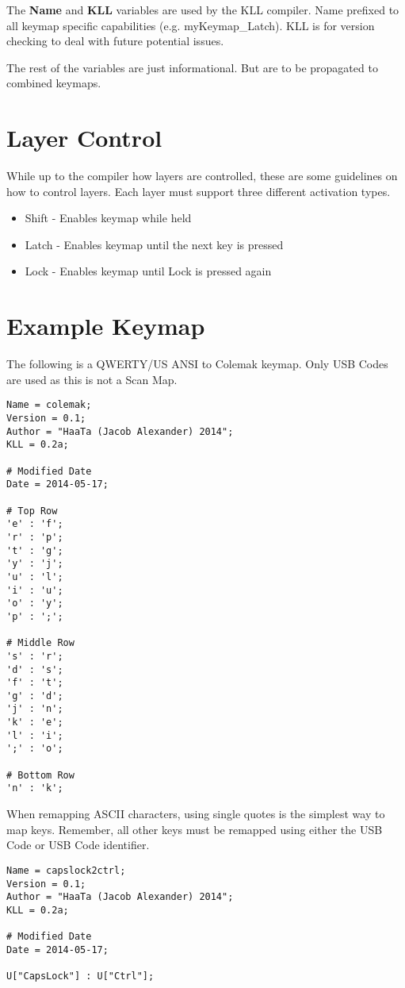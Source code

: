 \documentclass{kiibohd-template}
\begin{document}
The \textbf{Name} and \textbf{KLL} variables are used by the KLL compiler.
Name prefixed to all keymap specific capabilities (e.g. myKeymap\_Latch).
KLL is for version checking to deal with future potential issues.

The rest of the variables are just informational.
But are to be propagated to combined keymaps.


\section{Layer Control}

While up to the compiler how layers are controlled, these are some guidelines on how to control layers.
Each layer must support three different activation types.

\begin{itemize}
	\item Shift - Enables keymap while held
    \item Latch - Enables keymap until the next key is pressed
    \item Lock - Enables keymap until Lock is pressed again
\end{itemize}


\section{Example Keymap}

The following is a QWERTY/US ANSI to Colemak keymap.
Only USB Codes are used as this is not a Scan Map.

\begin{lstlisting}
Name = colemak;
Version = 0.1;
Author = "HaaTa (Jacob Alexander) 2014";
KLL = 0.2a;

# Modified Date
Date = 2014-05-17;

# Top Row
'e' : 'f';
'r' : 'p';
't' : 'g';
'y' : 'j';
'u' : 'l';
'i' : 'u';
'o' : 'y';
'p' : ';';

# Middle Row
's' : 'r';
'd' : 's';
'f' : 't';
'g' : 'd';
'j' : 'n';
'k' : 'e';
'l' : 'i';
';' : 'o';

# Bottom Row
'n' : 'k';
\end{lstlisting}

When remapping ASCII characters, using single quotes is the simplest way to map keys.
Remember, all other keys must be remapped using either the USB Code or USB Code identifier.

\begin{lstlisting}
Name = capslock2ctrl;
Version = 0.1;
Author = "HaaTa (Jacob Alexander) 2014";
KLL = 0.2a;

# Modified Date
Date = 2014-05-17;

U["CapsLock"] : U["Ctrl"];
\end{lstlisting}
\end{document}
